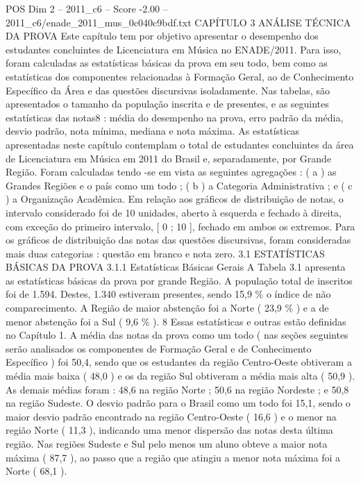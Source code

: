 \begin{textsample}{POS Dim 2 – 2011\_c6 – Score -2.00 – 2011\_c6/enade\_2011\_mus\_0c040c9bdf.txt}  \label{ex:f2_pos_407}
CAPÍTULO 3 ANÁLISE TÉCNICA DA PROVA Este capítulo tem por objetivo apresentar o desempenho dos estudantes concluintes de Licenciatura em Música no ENADE/2011.
Para isso, foram calculadas as estatísticas básicas da prova em seu todo, bem como as estatísticas dos componentes relacionadas à Formação Geral, ao de Conhecimento Específico da Área e das questões discursivas isoladamente.
Nas tabelas, são apresentados o tamanho da população inscrita e de presentes, e as seguintes estatísticas das notas8 : média do desempenho na prova, erro padrão da média, desvio padrão, nota mínima, mediana e nota máxima.
As estatísticas apresentadas neste capítulo contemplam o total de estudantes concluintes da área de Licenciatura em Música em 2011 do Brasil e, separadamente, por Grande Região.
Foram calculadas tendo -se em vista as seguintes agregações : ( a ) as Grandes Regiões e o país como um todo ; ( b ) a Categoria Administrativa ; e ( c ) a Organização Acadêmica.
Em relação aos gráficos de distribuição de notas, o intervalo considerado foi de 10 unidades, aberto à esquerda e fechado à direita, com exceção do primeiro intervalo, [ 0 ; 10 ], fechado em ambos os extremos.
Para os gráficos de distribuição das notas das questões discursivas, foram consideradas mais duas categorias : questão em branco e nota zero. 3.1 ESTATÍSTICAS BÁSICAS DA PROVA 3.1.1 Estatísticas Básicas Gerais A Tabela 3.1 apresenta as estatísticas básicas da prova por grande Região.
A população total de inscritos foi de 1.594.
Destes, 1.340 estiveram presentes, sendo 15,9 \% o índice de não comparecimento.
A Região de maior abstenção foi a Norte ( 23,9 \% ) e a de menor abstenção foi a Sul ( 9,6 \% ). 8 Essas estatísticas e outras estão definidas no Capítulo 1.
A média das notas da prova como um todo ( nas seções seguintes serão analisados os componentes de Formação Geral e de Conhecimento Específico ) foi 50,4, sendo que os estudantes da região Centro-Oeste obtiveram a média mais baixa ( 48,0 ) e os da região Sul obtiveram a média mais alta ( 50,9 ).
As demais médias foram : 48,6 na região Norte ; 50,6 na região Nordeste ; e 50,8 na região Sudeste.
O desvio padrão para o Brasil como um todo foi 15,1, sendo o maior desvio padrão encontrado na região Centro-Oeste ( 16,6 ) e o menor na região Norte ( 11,3 ), indicando uma menor dispersão das notas desta última região.
Nas regiões Sudeste e Sul pelo menos um aluno obteve a maior nota máxima ( 87,7 ), ao passo que a região que atingiu a menor nota máxima foi a Norte ( 68,1 ).

\end{textsample}
